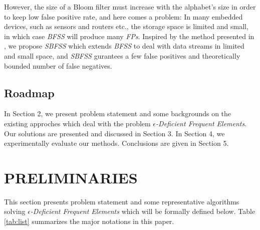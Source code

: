 \documentclass[conference]{IEEEtran}
\begin{document}
However, the size of a Bloom filter must increase with the alphabet's size in order to keep low false positive rate, and here comes a problem: In many embedded devices, such as sensors and routers etc., the storage space is limited and small, in which case \emph{BFSS} will produce many \emph{FPs}. Inspired by the method presented in \cite{IEEEexample:sbf}, we propose \emph{SBFSS} which extends \emph{BFSS} to deal with data streams in limited and small space, and \emph{SBFSS} gurantees a few false positives and theoretically bounded number of false negatives.\par

\subsection{Roadmap}
In Section 2, we present problem statement and some backgrounds on the existing approches which deal with the problem $\epsilon$\emph{-Deficient Frequent Elements}. Our solutions are presented and discussed in Section 3. In Section 4, we experimentally evaluate our methods. Conclusions are given in Section 5.

\section{PRELIMINARIES}
This section presents problem statement and some representative algorithms solving $\epsilon$\emph{-Deficient Frequent Elements} \cite{IEEEexample:sticky} which will be formally defined below. Table \ref{tab:list} summarizes the major notations in this paper.
\end{document}
